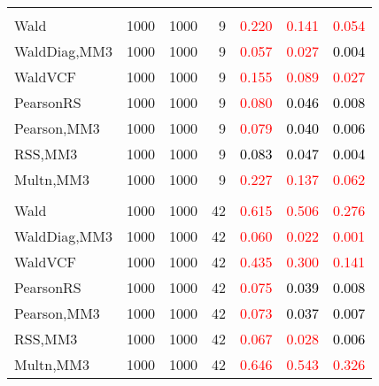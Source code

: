 \documentclass[
]{article}
\begin{document}
\begin{table}[H]
{\begin{tabular}[t]{lrrrrrr}
\addlinespace[0.3em]
\multicolumn{7}{l}{\textbf{2F 10V}}\\
\hspace{1em}Wald & 1000 & 1000 & 9 & \textcolor{red}{0.220} & \textcolor{red}{0.141} & \textcolor{red}{0.054}\\
\hspace{1em}WaldDiag,MM3 & 1000 & 1000 & 9 & \textcolor{red}{0.057} & \textcolor{red}{0.027} & \textcolor{black}{0.004}\\
\hspace{1em}WaldVCF & 1000 & 1000 & 9 & \textcolor{red}{0.155} & \textcolor{red}{0.089} & \textcolor{red}{0.027}\\
\hspace{1em}PearsonRS & 1000 & 1000 & 9 & \textcolor{red}{0.080} & \textcolor{black}{0.046} & \textcolor{black}{0.008}\\
\hspace{1em}Pearson,MM3 & 1000 & 1000 & 9 & \textcolor{red}{0.079} & \textcolor{black}{0.040} & \textcolor{black}{0.006}\\
\hspace{1em}RSS,MM3 & 1000 & 1000 & 9 & \textcolor{black}{0.083} & \textcolor{black}{0.047} & \textcolor{black}{0.004}\\
\hspace{1em}Multn,MM3 & 1000 & 1000 & 9 & \textcolor{red}{0.227} & \textcolor{red}{0.137} & \textcolor{red}{0.062}\\
\addlinespace[0.3em]
\multicolumn{7}{l}{\textbf{3F 15V}}\\
\hspace{1em}Wald & 1000 & 1000 & 42 & \textcolor{red}{0.615} & \textcolor{red}{0.506} & \textcolor{red}{0.276}\\
\hspace{1em}WaldDiag,MM3 & 1000 & 1000 & 42 & \textcolor{red}{0.060} & \textcolor{red}{0.022} & \textcolor{red}{0.001}\\
\hspace{1em}WaldVCF & 1000 & 1000 & 42 & \textcolor{red}{0.435} & \textcolor{red}{0.300} & \textcolor{red}{0.141}\\
\hspace{1em}PearsonRS & 1000 & 1000 & 42 & \textcolor{red}{0.075} & \textcolor{black}{0.039} & \textcolor{black}{0.008}\\
\hspace{1em}Pearson,MM3 & 1000 & 1000 & 42 & \textcolor{red}{0.073} & \textcolor{black}{0.037} & \textcolor{black}{0.007}\\
\hspace{1em}RSS,MM3 & 1000 & 1000 & 42 & \textcolor{red}{0.067} & \textcolor{red}{0.028} & \textcolor{black}{0.006}\\
\hspace{1em}Multn,MM3 & 1000 & 1000 & 42 & \textcolor{red}{0.646} & \textcolor{red}{0.543} & \textcolor{red}{0.326}\\
\bottomrule
\end{tabular}}
\endgroup{}
\end{table}
\end{document}

